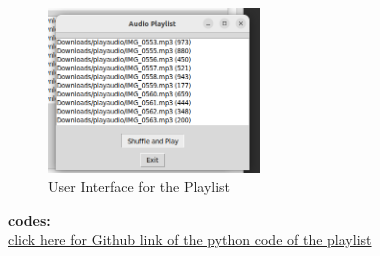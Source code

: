 \documentclass[12pt,onecolumn,notitlepage]{article}
\begin{document}
 
 \begin{figure}[h!]
  \centering
  \includegraphics[width=0.5\textwidth]{playlistui.png}
  \caption{User Interface for the Playlist }
  \label{fig:graphical user interface}
\end{figure}
\textbf{\large{codes:}}\\
\href{https://github.com/rishithapallala/AI1110/blob/main/software_assignment/playlist.py}{click here for Github link of the python code of the playlist}
\end{document}
